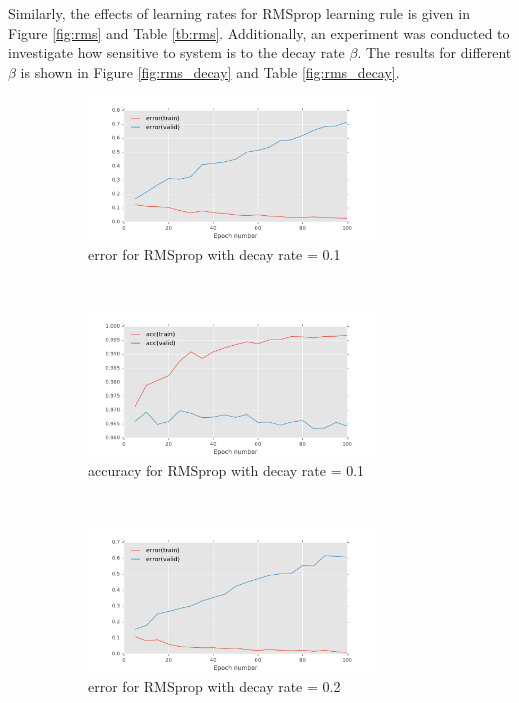 \documentclass[11pt]{article}
\begin{document}
Similarly, the effects of learning rates for RMSprop learning rule is given in Figure \ref{fig:rms} and Table \ref{tb:rms}. Additionally, an experiment was conducted to investigate how sensitive to system is to the decay rate $\beta$. The results for different $\beta$ is shown in Figure \ref{fig:rms_decay} and Table \ref{fig:rms_decay}.
\begin{figure}[t!]
    \centering
    \begin{subfigure}[t]{0.45\textwidth}
        \centering
        \includegraphics[height=1.5in]{error_with_RMSprop_decay_0_1.pdf}
        \caption{error for RMSprop with decay rate = 0.1}
    \end{subfigure}   
    ~
    \begin{subfigure}[t]{0.45\textwidth}
        \centering
        \includegraphics[height=1.5in]{acc_with_RMSprop_decay_0_1.pdf}
        \caption{accuracy for RMSprop with decay rate =  0.1}
    \end{subfigure}    
	~
    \begin{subfigure}[t]{0.45\textwidth}
        \centering
        \includegraphics[height=1.5in]{error_with_RMSprop_decay_0_2.pdf}
        \caption{error for RMSprop with decay rate = 0.2}
    \end{subfigure}   
    ~
    \begin{subfigure}[t]{0.45\textwidth}

\end{subfigure}
\end{figure}
\end{document}
